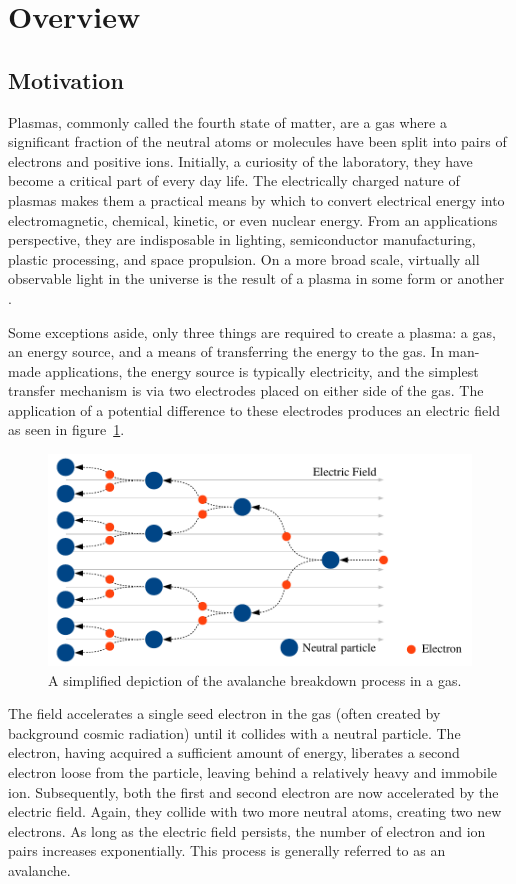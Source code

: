 \section{Overview}

\subsection{Motivation}
Plasmas, commonly called the fourth state of matter, are a gas where a
significant fraction of the neutral atoms or molecules have been split into
pairs of electrons and positive ions. Initially, a curiosity of the laboratory,
they have become a critical part of every day life. The electrically charged
nature of plasmas makes them a practical means by which to convert electrical
energy into electromagnetic, chemical, kinetic, or even nuclear energy. From an
applications perspective, they are indisposable in lighting, semiconductor
manufacturing, plastic processing, and space propulsion. On a more broad scale,
virtually all observable light in the universe is the result of a plasma in some
form or another \cite{NA2007}.

Some exceptions aside, only three things are required to create a plasma: a gas,
an energy source, and a means of transferring the energy to the gas. In man-made
applications, the energy source is typically electricity, and the simplest
transfer mechanism is via two electrodes placed on either side of the gas. The
application of a potential difference to these electrodes produces an electric
field as seen in figure~\ref{fig:avalanche}.
\begin{figure}
  \centering
  \includegraphics{./chapters/introduction/figures/avalanche.pdf}
  \caption{A simplified depiction of the avalanche breakdown process in a gas.}
  \label{fig:avalanche}
\end{figure}
The field accelerates a single seed electron in the gas (often created by
background cosmic radiation) until it collides with a neutral particle. The
electron, having acquired a sufficient amount of energy, liberates a second
electron loose from the particle, leaving behind a relatively heavy and immobile
ion. Subsequently, both the first and second electron are now accelerated by the
electric field. Again, they collide with two more neutral atoms, creating two
new electrons. As long as the electric field persists, the number of electron
and ion pairs increases exponentially. This process is generally referred to as
an avalanche.

